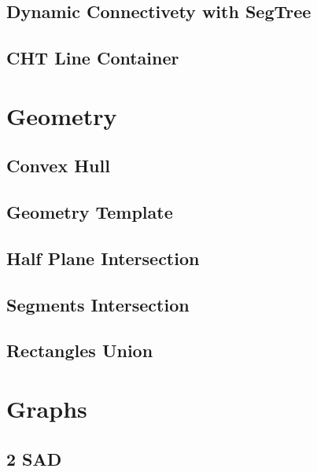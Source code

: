 \subsection{Dynamic Connectivety with SegTree}
\raggedbottom
\hrulefill
\subsection{CHT Line Container}
\raggedbottom
\hrulefill

\section{Geometry}
\subsection{Convex Hull}
\raggedbottom
\hrulefill
\subsection{Geometry Template}
\raggedbottom
\hrulefill
\subsection{Half Plane Intersection}
\raggedbottom
\hrulefill
\subsection{Segments Intersection}
\raggedbottom
\hrulefill
\subsection{Rectangles Union}
\raggedbottom
\hrulefill

\section{Graphs}
\subsection{2 SAD}
\raggedbottom
\hrulefill
